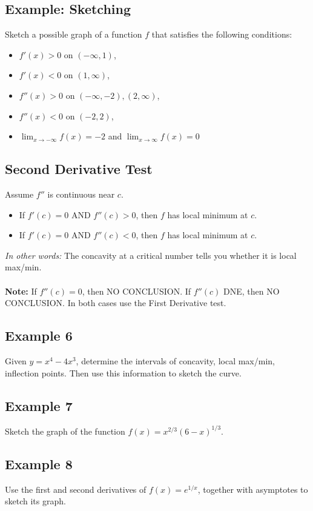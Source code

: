 \documentclass[10pt]{book}
\theoremstyle{definition}
\begin{document}
\subsection*{Example: Sketching}
Sketch a possible graph of a function $f$ that satisfies the following conditions:
\begin{itemize}
    \item $f'(x)>0$ on $(-\infty,1)$,
    \item $f'(x)<0$ on $(1,\infty)$,
    \item $f''(x)>0$ on $(-\infty,-2), (2,\infty)$,
    \item $f''(x)<0$ on $(-2,2)$,
    \item $\displaystyle\lim_{x\rightarrow-\infty}f(x)=-2$ and $\displaystyle\lim_{x\rightarrow\infty}f(x)=0$\vspace{1cm}
\end{itemize}
\begin{tcolorbox}
\subsection*{Second Derivative Test} Assume $f''$ is continuous near $c$.
\begin{itemize}
    \item If $f'(c)=0$ AND $f''(c)>0$, then $f$ has local minimum at $c$.
    \item If $f'(c)=0$ AND $f''(c)<0$, then $f$ has local minimum at $c$.
\end{itemize}
\textit{In other words:} The concavity at a critical number tells you whether it is local max/min.\\ \\
\textbf{Note:} If $f''(c)=0$, then NO CONCLUSION.
If $f''(c)$ DNE, then NO CONCLUSION. In both cases use the First Derivative test.
\end{tcolorbox}
\subsection*{Example 6} Given $y=x^4-4x^3$, determine the intervals of concavity, local max/min, inflection points. Then use this information to sketch the curve.
\clearpage
\subsection*{Example 7} Sketch the graph of the function $f(x)=x^{2/3}(6-x)^{1/3}$.
\clearpage
\subsection*{Example 8} Use the first and second derivatives of $f(x)=e^{1/x}$, together with asymptotes to sketch its graph.
\end{document}
